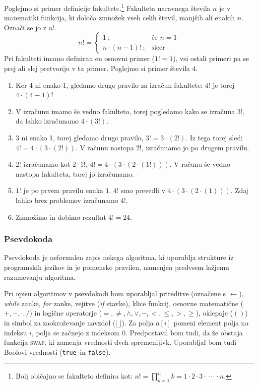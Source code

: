 \documentclass[a4paper,oneside,12pt]{article}
\def\False{\texttt{false}}
\def\True{\texttt{true}}
\begin{document}
Poglejmo si primer definicije fakultete.\footnote{Bolj običajno se fakulteto definira kot:
$n! = \displaystyle\prod_{k=1}^{n} k = 1 \cdot 2 \cdot 3 \cdot \ \cdots\  \cdot n.$} Fakulteta naravnega števila $n$ je v matematiki
funkcija, ki določa zmnožek vseh celih števil, manjših ali enakih $n$. Označi se jo z $n!$.
\[
n! = \left\{ 
\begin{array}{rl}
     1             \ ;& \mbox{če $n = 1$} \\
     n \cdot (n-1)!\ ;& \mbox{sicer}
\end{array} \right.
\]
Pri fakulteti imamo definiran en osnovni primer ($1! = 1$), vsi ostali primeri pa se prej
ali slej pretvorijo v ta primer. Poglejmo si primer števila 4.
\begin{enumerate}
  \item Ker 4 ni enako 1, gledamo drugo pravilo za izračun fakultete: $4!$ je torej $4
    \cdot \left(4 - 1\right)!$
  \item V izračunu imamo še vedno fakulteto, torej pogledamo kako se izračuna $3!$, da
    lahko izračunamo $4 \cdot \left(3!\right)$.
  \item 3 ni enako 1, torej gledamo drugo pravilo, $3! = 3 \cdot (2!)$. Iz tega
    torej sledi \mbox{$4! =
    4 \cdot \left(3 \cdot \left(2!\right)\right)$}. V računu nastopa $2!$, izračunamo jo po drugem pravilu.
  \item $2!$ izračunamo kot $2 \cdot 1!$, $4! = 4 \cdot \left(3 \cdot \left(2 \cdot \left(1!\right)\right)\right)$. V računu še
    vedno nastopa fakulteta, torej jo izračunamo.
  \item $1!$ je po prvem pravilu enaka $1$. $4!$ smo prevedli v $4 \cdot \left(3 \cdot \left(2 \cdot
    \left(1\right)\right)\right)$. Zdaj lahko brez problemov izračunamo $4!$.
  \item Zmnožimo in dobimo rezultat $4! = 24$.
\end{enumerate}

\subsubsection{Psevdokoda}
Psevdokoda je neformalen zapis nekega algoritma, ki uporablja strukture iz programskih
jezikov in je pomensko pravilen, namenjen predvsem lažjemu razumevanju algoritma.

Pri opisu algoritmov v psevdokodi bom uporabljal prireditve (označene s $\gets$), 
\emph{while} zanke, \emph{for} zanke, vejitve (\emph{if} stavke), klice 
funkcij, osnovne  matematične ($+, -, \cdot, /$) in logične operatorje ($=, 
\neq, \wedge, \vee, \neg, <, \leq, >, \geq$), oklepaje ($()$) in simbol za zaokroževanje
navzdol ($\lfloor\rfloor$). 
Za polja $a[i]$ pomeni element polja na indeksu $i$, polja se začnejo z indeksom $0$.
Predpostavil bom tudi, da že obstaja funkcija \textsc{swap}, ki zamenja vrednosti dveh
spremenljivk. Uporabljal bom tudi Boolovi vrednosti (\True\ in \False).
\end{document}
